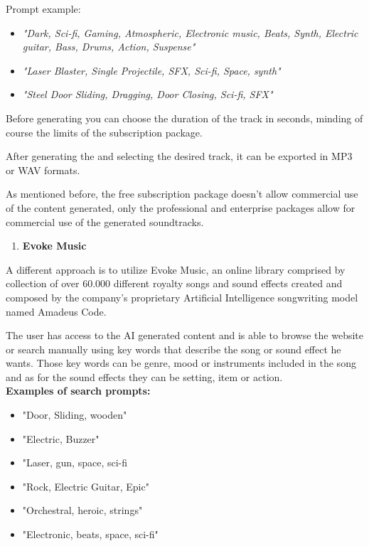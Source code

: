 \documentclass[a4paper,one side,12pt]{book}
\begin{document}
Prompt example:


\begin{itemize}
\item
  \emph{"Dark, Sci-fi, Gaming, Atmospheric, Electronic music, Beats,
  Synth, Electric guitar, Bass, Drums, Action, Suspense"}
\item
  \emph{"Laser Blaster, Single Projectile, SFX, Sci-fi, Space, synth"}
\item
  \emph{"Steel Door Sliding, Dragging, Door Closing, Sci-fi, SFX"}
\end{itemize}

Before generating you can choose the duration of the track in seconds,
minding of course the limits of the subscription package.

After generating the and selecting the desired track, it can be exported
in MP3 or WAV formats.

As mentioned before, the free subscription package doesn't allow
commercial use of the content generated, only the professional and
enterprise packages allow for commercial use of the generated
soundtracks.

\begin{enumerate}
\def\labelenumi{\arabic{enumi}.}
\setcounter{enumi}{1}
\item
  \textbf{Evoke Music}
\end{enumerate}

A different approach is to utilize Evoke Music\cite{Evoke}, an online
library comprised by collection of over 60.000 different royalty songs
and sound effects created and composed by the company's proprietary
Artificial Intelligence songwriting model named Amadeus Code.

The user has access to the AI generated content and is able to browse
the website or search manually using key words that describe the song or
sound effect he wants. Those key words can be genre, mood or instruments
included in the song and as for the sound effects they can be setting,
item or action.\\

\textbf{Examples of search prompts:}

\begin{itemize}
\item
  "Door, Sliding, wooden"
\item
  "Electric, Buzzer"
\item
  "Laser, gun, space, sci-fi
\item
  "Rock, Electric Guitar, Epic"
\item
  "Orchestral, heroic, strings"
\item
  "Electronic, beats, space, sci-fi"
\end{itemize}
\end{document}
